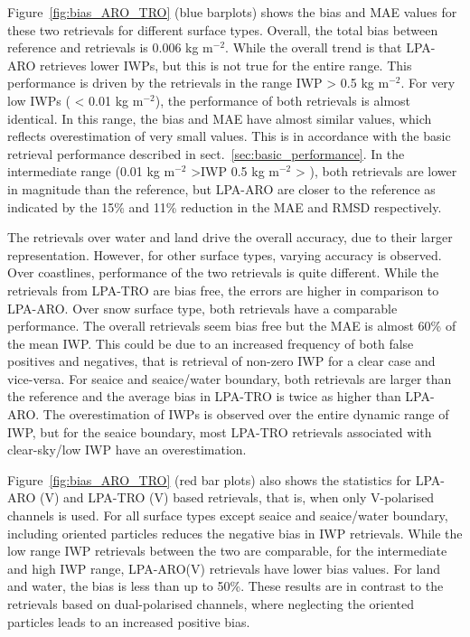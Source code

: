 \documentclass[amt, manuscript]{copernicus}
\begin{document}
Figure~\ref{fig:bias_ARO_TRO} (blue barplots) shows the bias and MAE values for these two retrievals for different surface types. Overall, the total bias between reference and retrievals is 0.006\,\,kg m$^{-2}$. While the overall trend is that LPA-ARO retrieves lower IWPs, but this is not true for the entire range. This performance is driven by the retrievals in the range IWP > 0.5\,\,kg m$^{-2}$. For very low IWPs ( < 0.01\,\,kg m$^{-2}$), the performance of both retrievals is almost identical. In this range, the bias and MAE have almost similar values, which reflects overestimation of very small values. This is in accordance with the basic retrieval performance described in sect.~\ref{sec:basic_performance}. In the intermediate range (0.01\,\,kg m$^{-2}$ >IWP 0.5\,\,kg m$^{-2}$ > ), both retrievals are lower in magnitude than the reference, but LPA-ARO are closer to the reference as indicated by the 15\% and 11\% reduction in the MAE and RMSD respectively. 

The retrievals over water and land drive the overall accuracy, due to their larger representation. However, for other surface types, varying accuracy is observed. Over coastlines, performance of the two retrievals is quite different. While the retrievals from LPA-TRO are bias free, the errors are higher in comparison to LPA-ARO. Over snow surface type, both retrievals have a comparable performance. The overall retrievals seem bias free but the MAE is almost 60\% of the mean IWP. This could be due to an increased frequency of both false positives and negatives, that is retrieval of non-zero IWP for a clear case and vice-versa. For seaice and seaice/water boundary, both retrievals are larger than the reference and the average bias in LPA-TRO is twice as higher than LPA-ARO. The overestimation of IWPs is observed over the entire dynamic range of IWP, but for the seaice boundary, most LPA-TRO retrievals associated with clear-sky/low IWP have an overestimation.

Figure~\ref{fig:bias_ARO_TRO} (red bar plots) also shows the statistics for LPA-ARO (V) and LPA-TRO (V) based retrievals, that is, when only V-polarised channels is used. For all surface types except seaice and seaice/water boundary, including oriented particles reduces the negative bias in IWP retrievals. While the low range IWP retrievals between the two are comparable, for the intermediate and high IWP range, LPA-ARO(V) retrievals have lower bias values. For land and water, the bias is less than up to 50\%. These results are in contrast to the retrievals based on dual-polarised channels, where neglecting the oriented particles leads to an increased positive bias.
\end{document}
